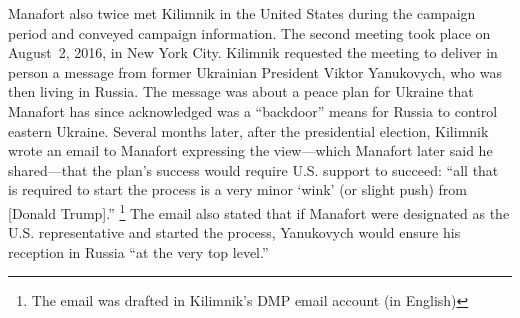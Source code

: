 Manafort also twice met Kilimnik in the United States during the campaign period and conveyed campaign information.
The second meeting took place on August~2, 2016, in New York City.
Kilimnik requested the meeting to deliver in person a message from former Ukrainian President Viktor Yanukovych, who was then living in Russia.
The message was about a peace plan for Ukraine that Manafort has since acknowledged was a ``backdoor'' means for Russia to control eastern Ukraine.
Several months later, after the presidential election, Kilimnik wrote an email to Manafort expressing the view---which Manafort later said he shared---that the plan's success would require U.S. support to succeed: ``all that is required to start the process is a very minor `wink' (or slight push) from [Donald Trump].''%
\footnote{The email was drafted in Kilimnik's DMP email account (in English) }
The email also stated that if Manafort were designated as the U.S. representative and started the process, Yanukovych would ensure his reception in Russia ``at the very top level.''

